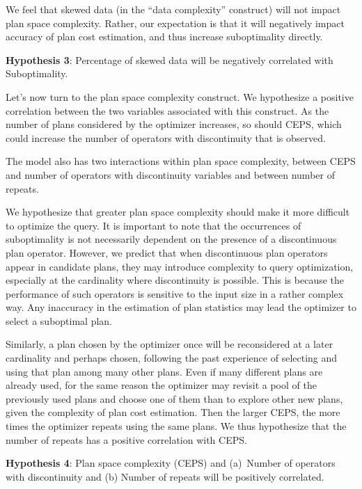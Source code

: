 \documentclass[prodmode,acmtods]{acmsmall}
\begin{document}
\vspace{0.6em}
We feel that skewed data (in the ``data complexity''
construct) will not impact plan space complexity. Rather, our expectation is
that it will negatively impact accuracy of plan cost estimation, and thus
increase suboptimality directly.

\vspace{0.6em}\noindent
{\bf Hypothesis 3}: Percentage of skewed data will be negatively correlated with Suboptimality.

\vspace{0.6em}
Let's now turn to the plan space complexity construct. We hypothesize a positive
correlation between the two variables associated with this construct. As the
number of plans considered by the optimizer increases, so should CEPS, which
could increase the number of operators with discontinuity that is observed.

The model also has two interactions within plan space
complexity, between 
CEPS and number of operators with discontinuity variables and between number of repeats.

We hypothesize that greater plan space complexity should make it more
difficult to optimize the query.  It is important to note that the
occurrences of suboptimality is not necessarily dependent on the presence
of a discontinuous plan operator. However, we predict that when
discontinuous plan operators appear in candidate plans, they may introduce
complexity to query optimization, especially at the cardinality where
discontinuity is possible. This is because the performance of such operators
is sensitive to the input size in a rather complex way. Any inaccuracy in
the estimation of plan statistics may lead the optimizer to select a suboptimal
plan.

\vspace{0.6em}
Similarly, a plan chosen by the optimizer once will be reconsidered at a
later cardinality and perhaps chosen, following
the past experience of selecting and using that plan among many other plans.
Even if many different plans are already used, 
for the same reason the optimizer may revisit a pool of 
the previously used plans and choose one of them than to explore other new plans, 
given the complexity of plan cost estimation. 
Then the larger CEPS, the more times the optimizer repeats using the same plans. 
We thus hypothesize that the number of repeats has a positive correlation with CEPS. 

\vspace{0.6em}\noindent
{\bf Hypothesis 4}: Plan space complexity (CEPS) and (a)~Number of operators
with discontinuity and (b) Number of repeats will be positively correlated.
\end{document}
